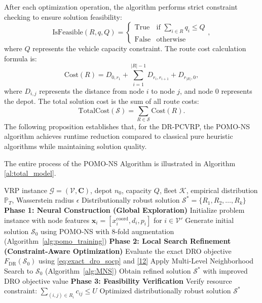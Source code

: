\documentclass[preprint,12pt,authoryear]{elsarticle}
\theoremstyle{definition}
\begin{document}
After each optimization operation, the algorithm performs strict constraint checking to ensure solution feasibility:
\begin{equation}
\text{IsFeasible}(R, q, Q) = \begin{cases} 
\text{True} & \text{if } \sum_{i \in R} q_i \leq Q \\
\text{False} & \text{otherwise}
\end{cases},
\end{equation}
\noindent where $Q$ represents the vehicle capacity constraint. The route cost calculation formula is:
\begin{equation}
\text{Cost}(R) = D_{0,r_1} + \sum_{i=1}^{|R|-1} D_{r_i,r_{i+1}} + D_{r_{|R|},0},
\end{equation}
\noindent where $D_{i,j}$ represents the distance from node $i$ to node $j$, and node 0 represents the depot. The total solution cost is the sum of all route costs:
\begin{equation}
\text{TotalCost}(\mathcal{S}) = \sum_{R \in \mathcal{S}} \text{Cost}(R).
\end{equation}
The following proposition establishes that, for the DR-PCVRP, the POMO-NS algorithm achieves runtime reduction compared to classical pure heuristic algorithms while maintaining solution quality. 



The entire process of the POMO-NS Algorithm is illustrated in Algorithm \ref{al:total_model}.
\begin{algorithm}[t]
\caption{POMO-NS Algorithm}
\label{al:total_model}
\small
\begin{algorithmic}[1]
\Require VRP instance $\mathcal{G} = (\mathcal{V}, \mathbf{C})$, depot $n_0$, capacity $Q$, fleet $\mathcal{K}$, empirical distribution $\mathbb{P}_T$, Wasserstein radius $\epsilon$
\Ensure Distributionally robust solution $\mathcal{S}^* = \{R_1, R_2, \ldots, R_k\}$
\State \textbf{Phase 1: Neural Construction (Global Exploration)}
\State Initialize problem instance with node features $\mathbf{x}_i = [x_i^{\text{coord}}, d_i, p_i]$ for $i \in \mathcal{V}'$
\State Generate initial solution $\mathcal{S}_0$ using POMO-NS with 8-fold augmentation (Algorithm~\ref{alg:pomo_training})
\State \textbf{Phase 2: Local Search Refinement (Constraint-Aware Optimization)}
\State Evaluate the exact DRO objective $F_{\mathrm{DR}}(\mathcal{S}_0)$ using \eqref{eq:exact_dro_socp} and \eqref{12}
\State Apply Multi-Level Neighborhood Search to $\mathcal{S}_0$ (Algorithm~\ref{alg:MNS})
\State Obtain refined solution $\mathcal{S}^*$ with improved DRO objective value
\State \textbf{Phase 3: Feasibility Verification}
    \State Verify resource constraint: $\sum_{(i,j) \in R_i} c_{ij} \leq U$
\EndFor
\State \Return Optimized distributionally robust solution $\mathcal{S}^*$
\end{algorithmic}
\end{algorithm}
\end{document}
